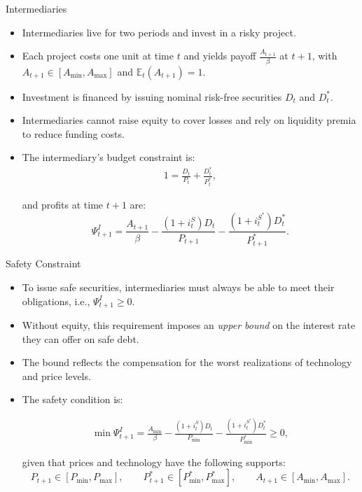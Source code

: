 \documentclass[11pt,aspectratio=169]{beamer}
\newcommand{\E}{\mathbb{E}}
\begin{document}
\begin{frame}{Intermediaries}
\small
\begin{itemize}

\item Intermediaries live for two periods and invest in a risky project.
\item Each project costs one unit at time $t$ and yields payoff $\tfrac{A_{t+1}}{\beta}$ at $t+1$, with  
$A_{t+1} \in [A_{\min}, A_{\max}]$ and $\E_t(A_{t+1}) = 1$.
\item Investment is financed by issuing nominal risk-free securities $D_t$ and $D_t^\ast$.
\item Intermediaries cannot raise equity to cover losses and rely on liquidity premia to reduce funding costs.

\vspace{0.6em}

\item The intermediary’s budget constraint is:
\begin{align}
1 = \frac{D_t}{P_t} + \frac{D_t^\ast}{P_t^\ast},
\label{4.18}
\end{align}

and profits at time $t+1$ are:
\[
\Psi_{t+1}^I
= \frac{A_{t+1}}{\beta}
- \frac{(1+i_t^S)D_t}{P_{t+1}}
- \frac{(1+i_t^{S^\ast})D_t^\ast}{P_{t+1}^\ast}.
\]
\end{itemize}
\end{frame}

\begin{frame}{Safety Constraint}
\small
\begin{itemize}
    \item To issue safe securities, intermediaries must always be able to meet their obligations, i.e., $\Psi_{t+1}^I \ge 0$.
    \item Without equity, this requirement imposes an \emph{upper bound} on the interest rate they can offer on safe debt.
    \item The bound reflects the compensation for the worst realizations of technology and price levels.
\item The safety condition is:

\begin{align}
\min \Psi_{t+1}^I
= \frac{A_{\min}}{\beta}
- \frac{(1+i_t^S)D_t}{P_{\min}}
- \frac{(1+i_t^{S^\ast})D_t^\ast}{P_{\min}^\ast}
\ge 0,
\label{4.20}
\end{align}

given that prices and technology have the following supports:
\[
P_{t+1} \in [P_{\min}, P_{\max}], \qquad
P_{t+1}^\ast \in [P_{\min}^\ast, P_{\max}^\ast], \qquad
A_{t+1} \in [A_{\min}, A_{\max}].
\]
\end{itemize}

\end{frame}
\end{document}
